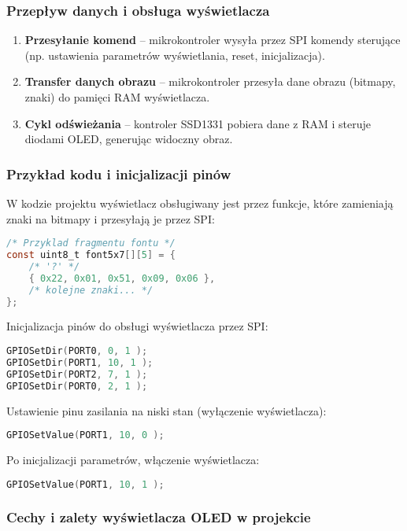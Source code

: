 \documentclass[a4paper,12pt]{report}
\begin{document}
\subsubsection*{Przepływ danych i obsługa wyświetlacza}

\begin{enumerate}
    \item \textbf{Przesyłanie komend} – mikrokontroler wysyła przez SPI komendy sterujące (np. ustawienia parametrów wyświetlania, reset, inicjalizacja).
    \item \textbf{Transfer danych obrazu} – mikrokontroler przesyła dane obrazu (bitmapy, znaki) do pamięci RAM wyświetlacza.
    \item \textbf{Cykl odświeżania} – kontroler SSD1331 pobiera dane z RAM i steruje diodami OLED, generując widoczny obraz.
\end{enumerate}

\subsubsection*{Przykład kodu i inicjalizacji pinów}

W kodzie projektu wyświetlacz obsługiwany jest przez funkcje, które zamieniają znaki na bitmapy i przesyłają je przez SPI:

\begin{lstlisting}[language=C]
/* Przyklad fragmentu fontu */
const uint8_t font5x7[][5] = {
    /* '?' */
    { 0x22, 0x01, 0x51, 0x09, 0x06 },
    /* kolejne znaki... */
};
\end{lstlisting}

Inicjalizacja pinów do obsługi wyświetlacza przez SPI:
\begin{lstlisting}[language=C]
GPIOSetDir(PORT0, 0, 1 );
GPIOSetDir(PORT1, 10, 1 );
GPIOSetDir(PORT2, 7, 1 );
GPIOSetDir(PORT0, 2, 1 );
\end{lstlisting}

Ustawienie pinu zasilania na niski stan (wyłączenie wyświetlacza):
\begin{lstlisting}[language=C]
GPIOSetValue(PORT1, 10, 0 );
\end{lstlisting}
Po inicjalizacji parametrów, włączenie wyświetlacza:
\begin{lstlisting}[language=C]
GPIOSetValue(PORT1, 10, 1 );
\end{lstlisting}

\subsubsection*{Cechy i zalety wyświetlacza OLED w projekcie}
\end{document}
